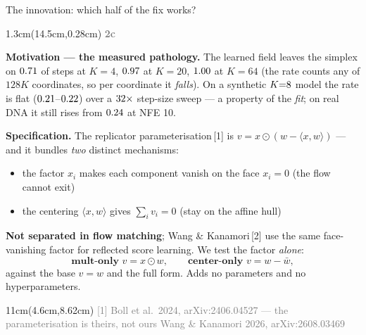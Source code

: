 \documentclass[aspectratio=169,10pt]{beamer}
\newcommand{\lab}[1]{%
  \begin{textblock*}{1.3cm}(14.5cm,0.28cm)
    \raggedleft\bfseries\small\textcolor{gray}{#1}
  \end{textblock*}}
\newcommand{\srcs}[1]{%
  \begin{textblock*}{11cm}(4.6cm,8.62cm)
    \raggedleft\fontsize{4.8}{5.6}\selectfont\textcolor{gray}{#1}
  \end{textblock*}}
\begin{document}
\begin{frame}{The innovation: which half of the fix works?}
\lab{2c}
\textbf{Motivation --- the measured pathology.} The learned field leaves the simplex on
$0.71$ of steps at $K{=}4$, $0.97$ at $K{=}20$, $1.00$ at $K{=}64$ (the rate
counts any of $128K$ coordinates, so per coordinate it \emph{falls}). On a synthetic $K{=}8$ model the rate is flat
($0.21$--$0.22$) over a $32\times$ step-size sweep --- a property of the \emph{fit};
on real DNA it still rises from $0.24$ at NFE 10.

\medskip
\textbf{Specification.} The replicator parameterisation\,[1] is
$v = x \odot (w - \langle x, w \rangle)$ --- and it bundles \emph{two} distinct mechanisms:
\begin{itemize}
\item the factor $x_i$ makes each component vanish on the face $x_i = 0$ (the flow cannot exit)
\item the centering $\langle x, w\rangle$ gives $\sum_i v_i = 0$ (stay on the affine hull)
\end{itemize}
\textbf{Not separated in flow matching}; Wang \& Kanamori\,[2] use the same face-vanishing factor for
reflected score learning. We test the factor \emph{alone}:
\[
\textbf{mult-only } v = x \odot w, \qquad \textbf{center-only } v = w - \bar{w},
\]
against the base $v = w$ and the full form. Adds no parameters and no hyperparameters.
\srcs{[1] Boll et al.\ 2024, arXiv:2406.04527 --- the parameterisation is theirs, not ours \quad [2] Wang \& Kanamori 2026, arXiv:2608.03469}
\end{frame}

\end{document}
